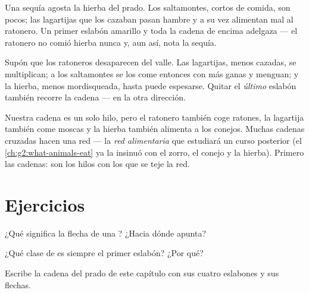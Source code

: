 \begin{example}\label{ex:g3:food-chains:dry}
Una sequía agosta la hierba del prado. Los saltamontes, cortos de
comida, son pocos; las lagartijas que los cazaban pasan hambre y a su
vez alimentan mal al ratonero. Un primer eslabón amarillo y toda la
cadena de encima adelgaza --- el ratonero no comió hierba nunca y, aun
así, nota la sequía.
\end{example}

\begin{example}\label{ex:g3:food-chains:hunter}
Supón que los ratoneros desaparecen del valle. Las lagartijas, menos
cazadas, se multiplican; a los saltamontes se los come entonces con
más ganas y menguan; y la hierba, menos mordisqueada, hasta puede
espesarse. Quitar el \emph{último} eslabón también recorre la cadena
--- en la otra dirección.
\end{example}

\begin{remark}\label{rem:g3:food-chains:web}
Nuestra cadena es un solo hilo, pero el ratonero también coge ratones,
la lagartija también come moscas y la hierba también alimenta a los
conejos. Muchas cadenas cruzadas hacen una red --- la \emph{red
alimentaria} que estudiará un curso posterior (el
\cref{ch:g2:what-animals-eat} ya la insinuó con el zorro, el conejo y
la hierba). Primero las cadenas: son los hilos con los que se teje la
red.
\end{remark}

\section{Ejercicios}

\begin{exercise}[$\star$]\label{exo:g3:food-chains:1}
¿Qué significa la flecha de una ? ¿Hacia dónde apunta?
\end{exercise}

\begin{exercise}[$\star$]\label{exo:g3:food-chains:2}
¿Qué clase de  es siempre el primer eslabón? ¿Por qué?
\end{exercise}

\begin{exercise}[$\star$]\label{exo:g3:food-chains:3}
Escribe la cadena del prado de este capítulo con sus cuatro eslabones
y sus flechas.
\end{exercise}

